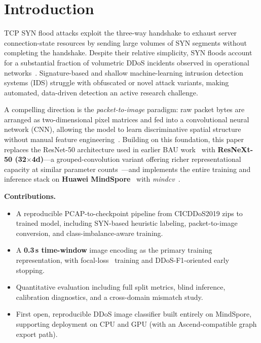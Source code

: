 \documentclass[conference]{IEEEtran}
\begin{document}
\section{Introduction}
\label{sec:intro}

TCP SYN flood attacks exploit the three-way handshake to exhaust server
connection-state resources by sending large volumes of SYN segments without
completing the handshake.
Despite their relative simplicity, SYN floods account for a substantial fraction
of volumetric DDoS incidents observed in operational networks~\cite{sharafaldin2018developing}.
Signature-based and shallow machine-learning intrusion detection systems (IDS)
struggle with obfuscated or novel attack variants, making automated, data-driven
detection an active research challenge.

A compelling direction is the \textit{packet-to-image} paradigm: raw packet bytes
are arranged as two-dimensional pixel matrices and fed into a convolutional neural
network (CNN), allowing the model to learn discriminative spatial structure
without manual feature engineering~\cite{bazzi2020resnet, lotfollahi2020deep}.
Building on this foundation, this paper replaces the ResNet-50 architecture used
in earlier BAU work~\cite{bazzi2020resnet} with \textbf{ResNeXt-50 (32$\times$4d)}—a
grouped-convolution variant offering richer representational capacity at similar
parameter counts~\cite{xie2017aggregated}—and implements the entire training and
inference stack on \textbf{Huawei MindSpore}~\cite{mindspore} with
\textit{mindcv}~\cite{mindcv}.

\textbf{Contributions.}
\begin{itemize}
  \item A reproducible PCAP-to-checkpoint pipeline from CICDDoS2019 zips to
        trained model, including SYN-based heuristic labeling, packet-to-image
        conversion, and class-imbalance-aware training.
  \item A \textbf{0.3\,s time-window} image encoding as the primary training
        representation, with focal-loss~\cite{lin2017focal} training and
        DDoS-F1-oriented early stopping.
  \item Quantitative evaluation including full split metrics, blind inference,
        calibration diagnostics, and a cross-domain mismatch study.
  \item First open, reproducible DDoS image classifier built entirely on
        MindSpore, supporting deployment on CPU and GPU (with an Ascend-compatible
        graph export path).
\end{itemize}
\end{document}
